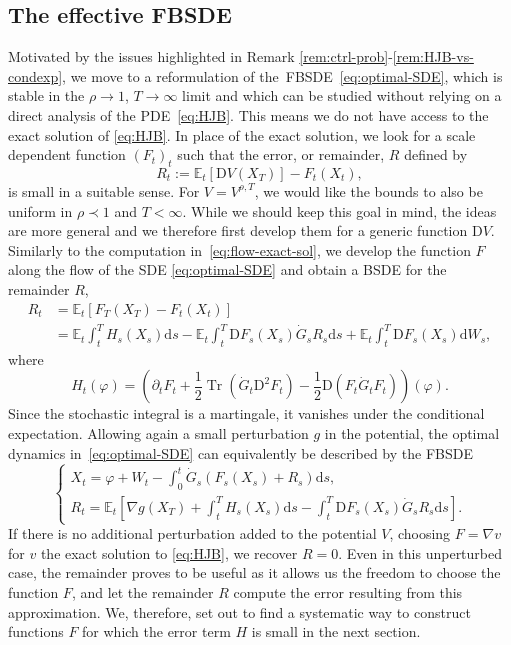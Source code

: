 \documentclass[11pt, a4paper]{scrartcl}
\numberwithin{equation}{section}
\theoremstyle{plain}
\theoremstyle{remark}
\newcommand{\assign}{:=}
\newcommand{\mathD}{\mathrm{D}}
\newcommand{\mathd}{\mathrm{d}}
\newcommand{\tmop}[1]{\ensuremath{\operatorname{#1}}}
\begin{document}
\subsection{The effective FBSDE}

Motivated by the issues highlighted in Remark
\ref{rem:ctrl-prob}-\ref{rem:HJB-vs-condexp}, we move to a reformulation of
the~FBSDE~\eqref{eq:optimal-SDE}, which is stable in the $\rho \rightarrow 1$,
$T \rightarrow \infty$ limit and which can be studied without relying on a
direct analysis of the PDE~\eqref{eq:HJB}. This means we do not have access to
the exact solution of \eqref{eq:HJB}. In place of the exact solution, we look
for a scale dependent function $(F_t)_t$ such that the error, or remainder,
$R$ defined by
\begin{equation}
	R_t \assign \mathbb{E}_t [\mathD V (X_T)] - F_t (X_t), \label{eq:Ansatz-R}
\end{equation}
is small in a suitable sense. For $V = V^{\rho, T}$, we would like the
bounds to also be uniform in $\rho \prec 1$ and $T < \infty$.
While we should keep this goal in mind, the ideas are more general and we
therefore first develop them for a generic function $\mathD V$. Similarly to the
computation in~\eqref{eq:flow-exact-sol}, we develop the function $F$ along
the flow of the SDE \eqref{eq:optimal-SDE} and obtain a BSDE for the remainder
$R$,
\begin{align*}
	R_t
	 & =\mathbb{E}_t [F_T (X_T) - F_t (X_t)] \\
	 & =\mathbb{E}_t  \int_t^T H_s
	(X_s) \mathd s -\mathbb{E}_t  \int_t^T \mathD F_s (X_s)  \dot{G}_s R_s
	\mathd s +\mathbb{E}_t \int_t^T \mathD F_s (X_s) \mathd W_s,
\end{align*}
where
\begin{equation}
	H_t (\varphi) = \left( \partial_t F_t + \frac{1}{2} \tmop{Tr} (\dot{G}_t
		\mathD^2 F_t) - \frac{1}{2} \mathD (F_t  \dot{G}_t F_t) \right) (\varphi) .
	\label{eq:def-H}
\end{equation}
Since the stochastic integral is a martingale, it vanishes under the
conditional expectation. Allowing again a small perturbation $g$ in the
potential, the optimal dynamics in~\eqref{eq:optimal-SDE} can equivalently be
described by the FBSDE
\begin{equation}
	\begin{cases}
		X_t = \varphi + W_t - \int_0^t \dot{G}_s (F_s (X_s) + R_s) \mathd s, \\
		R_t =\mathbb{E}_t \left[ \nabla g (X_T) + \int_t^T H_s (X_s) \mathd s -
			\int_t^T \mathD F_s (X_s)  \dot{G}_s R_s \mathd s \right] .
	\end{cases} \label{eq:FBSDE-generic}
\end{equation}
If there is no additional perturbation added to the potential $V$, choosing $F = \nabla v$ for  $v$ the exact solution to \eqref{eq:HJB}, we
recover $R = 0$. Even in this unperturbed case, the remainder proves to be useful as it allows us the freedom to
choose the function $F$, and let the remainder $R$ compute the error resulting
from this approximation. We, therefore, set out to find a systematic way to
construct functions $F$ for which the error term $H$ is small in the next
section.
\end{document}
